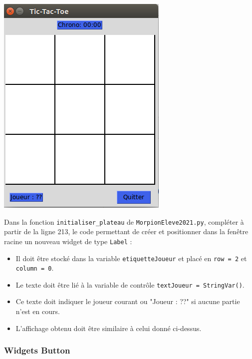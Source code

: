\documentclass[a4paper, french, 12pt]{article}  %
\newcounter{exo}
\newcounter{exoB}
\newenvironment{exerciceB2}
{\par \bigskip  \noindent \addtocounter{exoB}{1} \hrulefill \quad { \large \textbf{Exercice \theexoB}} \quad \hrulefill \par \medskip }
{\par \bigskip }
\begin{document}
\begin{exerciceB2}{}
 

\begin{center}
	\includegraphics[scale=0.6]{graphiques/morpion-labels.png}
\end{center}	 



Dans la fonction \lstinline+initialiser_plateau+ de \texttt{MorpionEleve2021.py}, compléter à partir de la ligne 213, le code permettant de créer et positionner dans la fenêtre racine un nouveau  widget de type \lstinline+Label+ :
\begin{itemize}[label=\textbullet]
\item Il doit être stocké dans la variable  \lstinline+etiquetteJoueur+ et placé en \lstinline+row = 2+ et \lstinline+column = 0+.
\item Le texte doit être lié à la variable de contrôle \lstinline+textJoueur = StringVar()+.
\item Ce texte doit indiquer le joueur courant ou "Joueur : ??" si aucune partie n'est en cours. 
\item L'affichage obtenu doit être similaire à celui donné ci-dessus.
\end{itemize}

\end{exerciceB2}

\subsubsection{Widgets Button}
\end{document}

